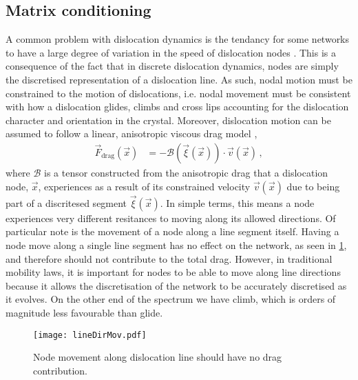 \subsection{Matrix conditioning}

A common problem with dislocation dynamics is the tendancy for some networks to have a large degree of variation in the speed of dislocation nodes \cite{bertin2019gpu,ddlab,arsenlis2007enabling}. This is a consequence of the fact that in discrete dislocation dynamics, nodes are simply the discretised representation of a dislocation line. As such, nodal motion must be constrained to the motion of dislocations, i.e. nodal movement must be consistent with how a dislocation glides, climbs and cross lips accounting for the dislocation character and orientation in the crystal. Moreover, dislocation motion can be assumed to follow a linear, anisotropic viscous drag model \cite{ddlab},
\begin{align}\label{eq:dragCoef}
    \vec{F}_\textrm{drag}(\vec{x}) & = -\mathcal{B}(\vec{\xi}(\vec{x})) \cdot \vec{v}(\vec{x})\,,
\end{align}
where $\mathcal{B}$ is a tensor constructed from the anisotropic drag that a dislocation node, $\vec{x}$, experiences as a result of its constrained velocity $\vec{v}(\vec{x})$ due to being part of a discritesed segment $\vec{\xi}(\vec{x})$. In simple terms, this means a node experiences very different resitances to moving along its allowed directions. Of particular note is the movement of a node along a line segment itself. Having a node move along a single line segment has no effect on the network, as seen in \cref{fig:lineMovement}, and therefore should not contribute to the total drag. However, in traditional mobility laws, it is important for nodes to be able to move along line directions because it allows the discretisation of the network to be accurately discretised as it evolves. On the other end of the spectrum we have climb, which is orders of magnitude less favourable than glide.
\begin{figure}\label{fig:lineMovement}
    \centering
    \texttt{[image: lineDirMov.pdf]}
    \caption{Node movement along dislocation line should have no drag contribution.}
\end{figure}

